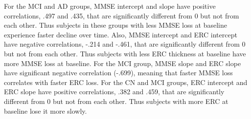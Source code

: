 \documentclass[12pt]{article}
\begin{document}
For the MCI and AD groups, MMSE intercept and slope have positive correlations, .497 and .435, that are significantly different from 0 but not from each other. Thus subjects in these groups with less MMSE loss at baseline experience faster decline over time. Also, MMSE intercept and ERC intercept have negative correlations, -.214 and -.461, that are significantly different from 0 but not from each other. Thus subjects with less ERC thickness at baseline have more MMSE loss at baseline. For the MCI group, MMSE slope and ERC slope have significant negative correlation (-.699), meaning that faster MMSE loss correlates with faster ERC loss. For the CN and MCI groups, ERC intercept and ERC slope have positive correlations, .382 and .459, that are significantly different from 0 but not from each other. Thus subjects with more ERC at baseline lose it more slowly. 
\end{document}
